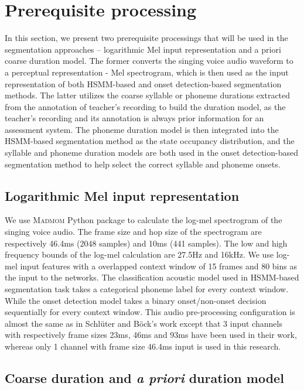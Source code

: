\section{Prerequisite processing}

In this section, we present two prerequisite processings that will be used in the segmentation approaches -- logarithmic Mel input representation and a priori coarse duration model. The former converts the singing voice audio waveform to a perceptual representation - Mel spectrogram, which is then used as the input representation of both \gls{HSMM}-based and onset detection-based segmentation methods. The latter utilizes the coarse syllable or phoneme durations extracted from the annotation of teacher's recording to build the duration model, as the teacher's recording and its annotation is always prior information for an assessment system. The phoneme duration model is then integrated into the \gls{HSMM}-based segmentation method as the state occupancy distribution, and the syllable and phoneme duration models are both used in the onset detection-based segmentation method to help select the correct syllable and phoneme onsets.

\subsection{Logarithmic Mel input representation}\label{sec:ch5:input_representation}

We use \textsc{Madmom} \cite{Bock2016} Python package to calculate the log-mel spectrogram of the singing voice audio. The frame size and hop size of the spectrogram are respectively 46.4ms (2048 samples) and 10ms (441 samples). The low and high frequency bounds of the log-mel calculation are 27.5Hz and 16kHz. We use log-mel input features with a overlapped context window of 15 frames and 80 bins as the input to the networks. The classification acoustic model used in \gls{HSMM}-based segmentation task takes a categorical phoneme label for every context window. While the onset detection model takes a binary onset/non-onset decision sequentially for every context window. This audio pre-processing configuration is almost the same as in Schl\"{u}ter and B\"{o}ck's work \cite{Schluter2014} except that 3 input channels with respectively frame sizes 23ms, 46ms and 93ms have been used in their work, whereas only 1 channel with frame size 46.4ms input is used in this research.

\subsection{Coarse duration and \textit{a priori} duration model}\label{sec:pp_coarse_duration}

